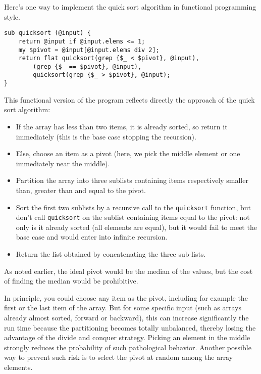 Here's one way to implement the quick sort algorithm in 
functional programming style.

\begin{verbatim}
sub quicksort (@input) {
    return @input if @input.elems <= 1;
    my $pivot = @input[@input.elems div 2];
    return flat quicksort(grep {$_ < $pivot}, @input), 
        (grep {$_ == $pivot}, @input), 
        quicksort(grep {$_ > $pivot}, @input);
}
\end{verbatim}

This functional version of the program reflects directly 
the approach of the quick sort algorithm:
\begin{itemize}
\item If the  array has less than two items, it is already 
sorted, so return it immediately (this is the base case 
stopping the recursion).
\item Else, choose an item as a pivot (here, we pick the 
middle element or one immediately near the middle).
\item Partition the array into three sublists containing 
items respectively smaller than, greater than and equal to 
the pivot.
\item Sort the first two sublists by a recursive call to 
the \verb'quicksort' function, but don't call \verb'quicksort' 
on the sublist containing items equal to the pivot: not only is 
it already sorted (all elements are equal), but it would fail 
to meet the base case and would enter into infinite recursion.
\item  Return the list obtained by concatenating the three 
sub-lists.
\end{itemize}

As noted earlier, the ideal pivot would be the median of the 
values, but the cost of finding the median would be prohibitive.

In principle, you could choose any item as the pivot, including 
for example the first or the last item of the array. But for 
some specific input (such as arrays already almost sorted, 
forward or backward), this can increase significantly the 
run time because the partitioning becomes totally unbalanced, 
thereby losing the advantage of the divide and conquer strategy. 
Picking an element in the middle strongly reduces the 
probability of such pathological behavior. Another possible way 
to prevent such risk is to select the pivot at random among 
the array elements.


